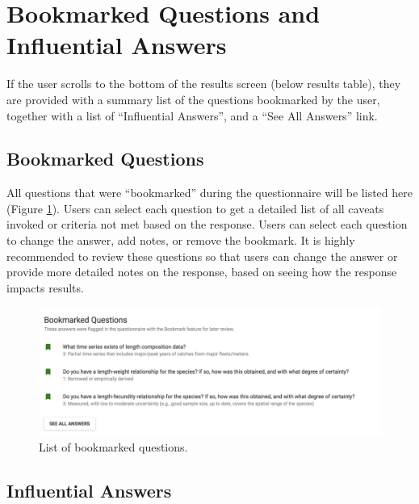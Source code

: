 \documentclass[
  11pt,
]{book}
\begin{document}
\hypertarget{bookmarked-questions-and-influential-answers}{%
\section{Bookmarked Questions and Influential Answers}\label{bookmarked-questions-and-influential-answers}}

If the user scrolls to the bottom of the results screen (below results table), they are provided with a summary list of the questions bookmarked by the user, together with a list of ``Influential Answers'', and a ``See All Answers'' link.

\hypertarget{bookmarked-questions}{%
\subsection{Bookmarked Questions}\label{bookmarked-questions}}

All questions that were ``bookmarked'' during the questionnaire will be listed here (Figure \ref{fig:flagged-questions}). Users can select each question to get a detailed list of all caveats invoked or criteria not met based on the response. Users can select each question to change the answer, add notes, or remove the bookmark. It is highly recommended to review these questions so that users can change the answer or provide more detailed notes on the response, based on seeing how the response impacts results.

\begin{figure}

{\centering \includegraphics[width=0.95\linewidth]{images/flagged-questions} 

}

\caption{List of bookmarked questions.}\label{fig:flagged-questions}
\end{figure}

\hypertarget{influential-answers}{%
\subsection{Influential Answers}\label{influential-answers}}
\end{document}
